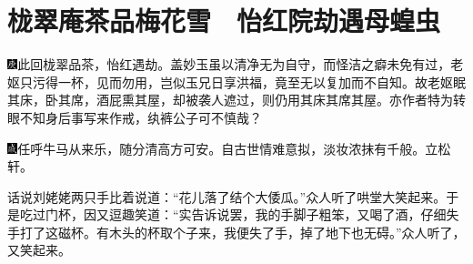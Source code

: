 

\chapter{栊翠庵茶品梅花雪　怡红院劫遇母蝗虫}

{\includegraphics[width=3mm]{../Images/00004}此回栊翠品茶，怡红遇劫。盖妙玉虽以清净无为自守，而怪洁之癖未免有过，老妪只污得一杯，见而勿用，岂似玉兄日享洪福，竟至无以复加而不自知。故老妪眠其床，卧其席，酒屁熏其屋，却被袭人遮过，则仍用其床其席其屋。亦作者特为转眼不知身后事写来作戒，纨裤公子可不慎哉？}

{\includegraphics[width=3mm]{../Images/00005}任呼牛马从来乐，随分清高方可安。自古世情难意拟，淡妆浓抹有千般。立松轩。}

话说刘姥姥两只手比着说道：``花儿落了结个大倭瓜。''众人听了哄堂大笑起来。于是吃过门杯，因又逗趣笑道：``实告诉说罢，我的手脚子粗笨，又喝了酒，仔细失手打了这磁杯。有木头的杯取个子来，我便失了手，掉了地下也无碍。''众人听了，又笑起来。

